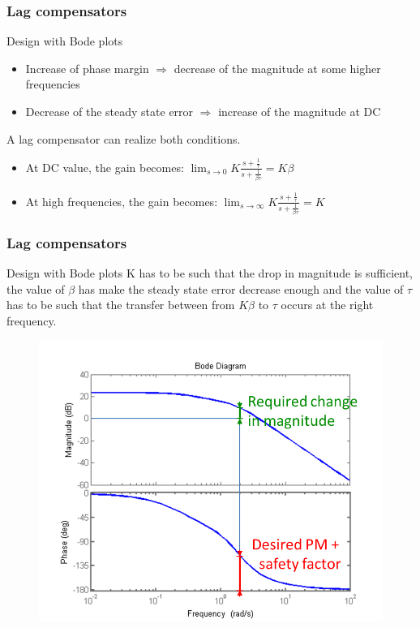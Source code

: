 \begin{frame}
	\frametitle{Lag compensators}
	\begin{block}{Design with Bode plots}
		\begin{itemize}
		\item Increase of phase margin $\Rightarrow$ decrease of the magnitude at some higher frequencies 
		\item Decrease of the steady state error $\Rightarrow$ increase of the magnitude at DC
		\end{itemize}
		A lag compensator can realize both conditions.
		\begin{itemize}
			\item At DC value, the gain becomes: $\lim_{s \to 0} K\frac{s + \frac{1}{\tau}}{s + \frac{1}{\beta\tau}} = K\beta$
			\item At high frequencies, the gain becomes:
			$\lim_{s \to \infty} K\frac{s + \frac{1}{\tau}}{s + \frac{1}{\beta\tau}} = K$ 
		\end{itemize}
	\end{block}
\end{frame}

\begin{frame}
	\frametitle{Lag compensators}
	\begin{block}{Design with Bode plots}
	K has to be such that the drop in magnitude is sufficient, the value of $\beta$ has make the steady state error decrease enough and the value of $\tau$ has to be such that the transfer between from $K\beta$ to $\tau$ occurs at the right frequency.
	\begin{figure}
		\centering
		\includegraphics[width=0.5
		\linewidth]{determinationKLagcompensator}
	\end{figure}
	\end{block}
\end{frame}

